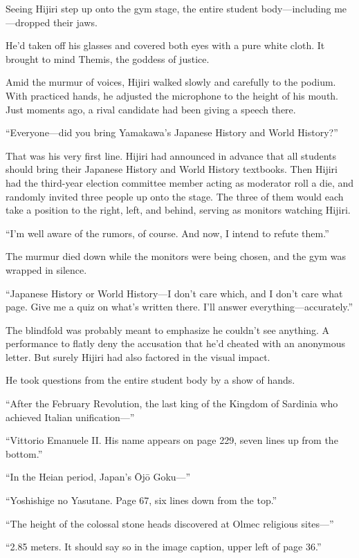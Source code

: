\documentclass[
    a4paper,
    12pt,
    twoside,
    openany,
    UTF8,
    fontset=windows
]{ctexbook}
\begin{document}
Seeing Hijiri step up onto the gym stage, the entire student body---including me---dropped their jaws.

He'd taken off his glasses and covered both eyes with a pure white cloth. It brought to mind Themis, the goddess of justice.

Amid the murmur of voices, Hijiri walked slowly and carefully to the podium. With practiced hands, he adjusted the microphone to the height of his mouth. Just moments ago, a rival candidate had been giving a speech there.

``Everyone---did you bring Yamakawa's Japanese History and World History?''

That was his very first line. Hijiri had announced in advance that all students should bring their Japanese History and World History textbooks. Then Hijiri had the third-year election committee member acting as moderator roll a die, and randomly invited three people up onto the stage. The three of them would each take a position to the right, left, and behind, serving as monitors watching Hijiri.

``I'm well aware of the rumors, of course. And now, I intend to refute them.''

The murmur died down while the monitors were being chosen, and the gym was wrapped in silence.

``Japanese History or World History---I don't care which, and I don't care what page. Give me a quiz on what's written there. I'll answer everything---accurately.''

The blindfold was probably meant to emphasize he couldn't see anything. A performance to flatly deny the accusation that he'd cheated with an anonymous letter. But surely Hijiri had also factored in the visual impact.

He took questions from the entire student body by a show of hands.

``After the February Revolution, the last king of the Kingdom of Sardinia who achieved Italian unification---''

``Vittorio Emanuele II. His name appears on page 229, seven lines up from the bottom.''

``In the Heian period, Japan's \=Oj\=o Goku---''

``Yoshishige no Yasutane. Page 67, six lines down from the top.''

``The height of the colossal stone heads discovered at Olmec religious sites---''

``2.85 meters. It should say so in the image caption, upper left of page 36.''
\end{document}
